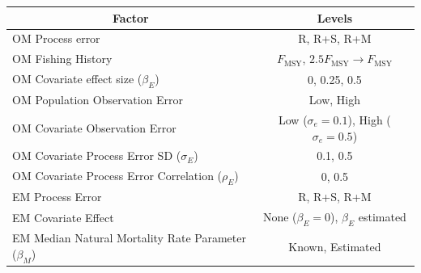 \begin{center}
\begin{tabular}{lc}
\hline\hline
\multicolumn{1}{c}{Factor}&\multicolumn{1}{c}{Levels}\tabularnewline
\hline
OM Process error&R, R+S, R+M\tabularnewline
OM Fishing History&$F_{\text{MSY}}$, $2.5F_{\text{MSY}} \rightarrow F_{\text{MSY}}$\tabularnewline
OM Covariate effect size ($\beta_E$)&0, 0.25, 0.5\tabularnewline
OM Population Observation Error&Low, High\tabularnewline
OM Covariate Observation Error&Low ($\sigma_e = 0.1$), High ($\sigma_e = 0.5$)\tabularnewline
OM Covariate Process Error SD ($\sigma_E$)&0.1, 0.5\tabularnewline
OM Covariate Process Error Correlation ($\rho_E$)&0, 0.5\tabularnewline
EM Process Error&R, R+S, R+M\tabularnewline
EM Covariate Effect&None ($\beta_E = 0$), $\beta_E$ estimated\tabularnewline
EM Median Natural Mortality Rate Parameter ($\beta_M$)&Known, Estimated\tabularnewline
\hline
\end{tabular}\end{center}
